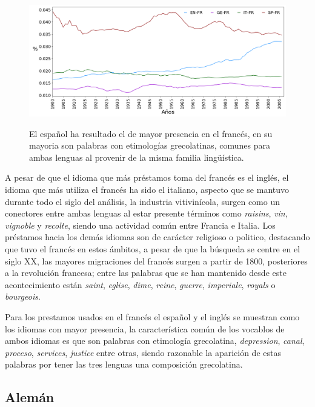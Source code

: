 \begin{figure}[h!]
	\centering
	\includegraphics[scale=.36]{Cap_4/PF2_S2_FR.png}
	\label{fig.ST_b_FR}
	\caption{El español ha resultado el de mayor presencia en el francés, en su mayoria son palabras con etimologías grecolatinas, comunes para ambas lenguas al provenir de la misma familia lingüística.}
\end{figure}
		
\clearpage


A pesar de que el idioma que más préstamos toma del francés es el inglés,  el idioma que más utiliza el francés ha sido el italiano,  aspecto que se mantuvo durante todo el siglo del análisis,  la industria vitivinícola, surgen como un conectores entre ambas lenguas al estar presente términos como  \textit{raisins}, \textit{vin}, \textit{vignoble} y \textit{recolte},  siendo una actividad común entre Francia e Italia.  Los préstamos hacia los demás idiomas son de carácter religioso o politico, destacando que tuvo el francés en estos ámbitos, a pesar de que la búsqueda se centre en el siglo XX, las mayores migraciones del francés surgen a partir de 1800, posteriores a la revolución francesa; entre las palabras que se han mantenido desde este acontecimiento están  \textit{saint}, \textit{eglise}, \textit{dime}, \textit{reine}, \textit{guerre}, \textit{imperiale}, \textit{royals} o \textit{bourgeois}.  


Para los prestamos usados en el francés el español y el inglés se muestran como los idiomas con mayor presencia, la característica común de los vocablos de ambos idiomas es que son palabras con etimología grecolatina, 
\textit{depression}, \textit{canal}, \textit{proceso}, \textit{services}, \textit{justice} entre otras,  siendo razonable la aparición de estas palabras por tener las tres lenguas una composición grecolatina. 


\clearpage
\subsection{Alemán}

